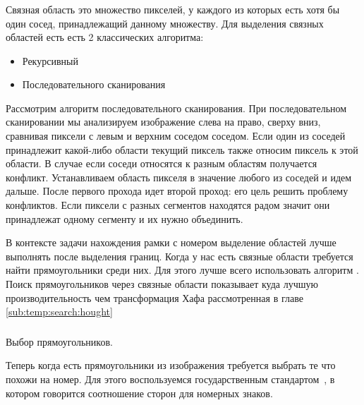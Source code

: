 \subsubsection{}
\label{sub:temp:search:segmentation}
\segmentation{}

Связная область это множество пикселей, у каждого из которых есть хотя бы один сосед, принадлежащий данному множеству. Для выделения связных областей есть есть 2 классических алгоритма:
\begin{itemize}
  \item Рекурсивный
  \item Последовательного сканирования
\end{itemize}
Рассмотрим алгоритм последовательного сканирования. При последовательном сканировании мы анализируем изображение слева на право, сверху вниз, сравнивая пиксели с левым и верхним соседом соседом. Если один из соседей принадлежит какой-либо области текущий пиксель также относим пиксель к этой области. В случае если соседи относятся к разным областям получается конфликт. Устанавливаем область пикселя в значение любого из соседей и идем дальше. После первого прохода идет второй проход: его цель решить проблему конфликтов. Если пиксели с разных сегментов находятся радом значит они принадлежат одному сегменту и их нужно объединить. 

В контексте задачи нахождения рамки с номером выделение областей лучше выполнять после выделения границ. Когда у нас есть связные области требуется найти прямоугольники среди них. Для этого лучше всего использовать алгоритм \minAreaRect{}. Поиск прямоугольников через связные области показывает куда лучшую производительность чем трансформация Хафа рассмотренная в главе \ref{sub:temp:search:hought}

\subsubsection{}
\label{sub:temp:search:selectrect}
Выбор прямоугольников.

Теперь когда есть прямоугольники из изображения требуется выбрать те что похожи на номер. Для этого воспользуемся государственным стандартом~\cite{stb_914_99}, в котором говорится соотношение сторон для номерных знаков.

